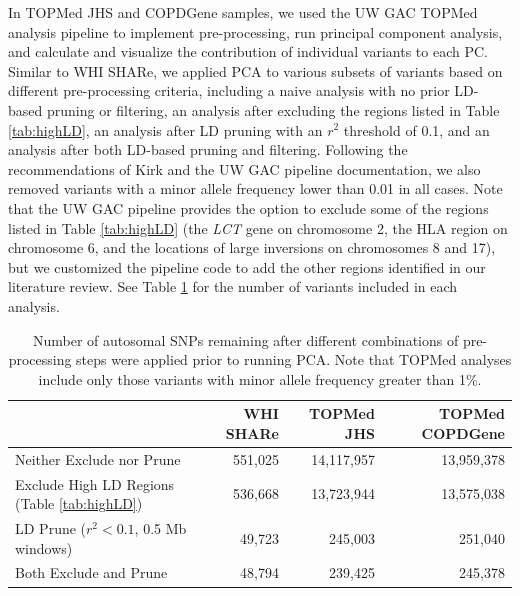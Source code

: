 \documentclass[12pt]{article}
\begin{document}
In TOPMed JHS and COPDGene samples, we used the UW GAC TOPMed analysis pipeline to implement pre-processing, run principal component analysis, and calculate and visualize the contribution of individual variants to each PC. 
Similar to WHI SHARe, we applied PCA to various subsets of variants based on different pre-processing criteria, including a naive analysis with no prior LD-based pruning or filtering, an analysis after excluding the regions listed in Table \ref{tab:highLD}, an analysis after LD pruning with an $r^2$ threshold of 0.1, and an analysis after both LD-based pruning and filtering.
Following the recommendations of Kirk \citep{JKdissertation} and the UW GAC pipeline documentation, we also removed variants with a minor allele frequency lower than 0.01 in all cases.
Note that the UW GAC pipeline provides the option to exclude some of the regions listed in Table \ref{tab:highLD} (the \textit{LCT} gene on chromosome 2, the HLA region on chromosome 6, and the locations of large inversions on chromosomes 8 and 17), but we customized the pipeline code to add the other regions identified in our literature review. 
See Table \ref{tab:preprocessN} for the number of variants included in each analysis.

\begin{table}
\small
\begin{tabular}{|l|rrr|}
\hline
 & WHI SHARe & TOPMed JHS & TOPMed COPDGene \\
\hline
Neither Exclude nor Prune & 551,025 & 14,117,957 & 13,959,378 \\
Exclude High LD Regions (Table \ref{tab:highLD}) & 536,668 & 13,723,944 & 13,575,038  \\
LD Prune ($r^2 < 0.1$, 0.5 Mb windows) & 49,723  &  245,003 & 251,040  \\
Both Exclude and Prune & 48,794 & 239,425  & 245,378  \\
\hline
\end{tabular}
\caption{Number of autosomal SNPs remaining after different combinations of pre-processing steps were applied prior to running PCA. Note that TOPMed analyses include only those variants with minor allele frequency greater than 1\%.} 
\label{tab:preprocessN}
\end{table}

\end{document}
